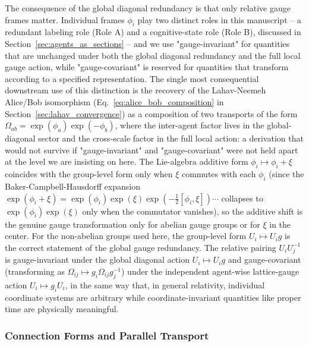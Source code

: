 \documentclass[11pt]{article}
\begin{document}
The consequence of the global diagonal redundancy is that only relative gauge frames matter. Individual frames $\phi_i$ play two distinct roles in this manuscript -- a redundant labeling role (Role A) and a cognitive-state role (Role B), discussed in Section~\ref{sec:agents_as_sections} -- and we use "gauge-invariant" for quantities that are unchanged under both the global diagonal redundancy and the full local gauge action, while "gauge-covariant" is reserved for quantities that transform according to a specified representation. The single most consequential downstream use of this distinction is the recovery of the Lahav-Neemeh Alice/Bob isomorphism (Eq.~\ref{eq:alice_bob_composition} in Section~\ref{sec:lahav_convergence}) as a composition of two transports of the form $\Omega_{ab} = \exp(\phi_a)\exp(-\phi_b)$, where the inter-agent factor lives in the global-diagonal sector and the cross-scale factor in the full local action: a derivation that would not survive if "gauge-invariant" and "gauge-covariant" were not held apart at the level we are insisting on here. The Lie-algebra additive form $\phi_i \mapsto \phi_i + \xi$ coincides with the group-level form only when $\xi$ commutes with each $\phi_i$ (since the Baker-Campbell-Hausdorff expansion $\exp(\phi_i + \xi) = \exp(\phi_i)\exp(\xi)\exp(-\tfrac12 [\phi_i, \xi]) \cdots$ collapses to $\exp(\phi_i)\exp(\xi)$ only when the commutator vanishes), so the additive shift is the genuine gauge transformation only for abelian gauge groups or for $\xi$ in the center. For the non-abelian groups used here, the group-level form $U_i \mapsto U_i g$ is the correct statement of the global gauge redundancy. The relative pairing $U_i U_j^{-1}$ is gauge-invariant under the global diagonal action $U_i \mapsto U_i g$ and gauge-covariant (transforming as $\Omega_{ij} \mapsto g_i \Omega_{ij} g_j^{-1}$) under the independent agent-wise lattice-gauge action $U_i \mapsto g_i U_i$, in the same way that, in general relativity, individual coordinate systems are arbitrary while coordinate-invariant quantities like proper time are physically meaningful.

\subsubsection{Connection Forms and Parallel Transport}
\label{sec:connection_forms}
\end{document}
